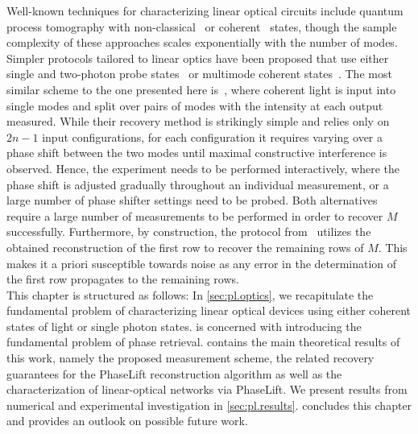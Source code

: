 Well-known techniques for characterizing linear optical circuits include quantum process tomography with non-classical~\cite{Brien_2004_Quantum} or coherent~\cite{Keshari_2011_Quantum} states, though the sample complexity of these approaches scales exponentially with the number of modes.
Simpler protocols tailored to linear optics have been proposed that use either single and two-photon probe states~\cite{Laing_2012_SuperStable,Dhand_2016_Accurate,Spagnolo_2017_Learning} or multimode coherent states~\cite{Keshari_2013_Direct,Tillmann_2016_On}.
The most similar scheme to the one presented here is~\cite{Keshari_2013_Direct}, where coherent light is input into single modes and split over pairs of modes with the intensity at each output measured.
While their recovery method is strikingly simple and relies only on $2n-1$ input configurations, for each configuration it requires varying over a phase shift between the two modes until maximal constructive interference is observed.
Hence, the experiment needs to be performed interactively, where the phase shift is adjusted gradually throughout an individual measurement, or a large number of phase shifter settings need to be probed.
Both alternatives require a large number of measurements to be performed in order to recover $M$ successfully.
Furthermore, by construction, the protocol from~\cite{Keshari_2013_Direct} utilizes the obtained reconstruction of the first row to recover the remaining rows of $M$.
This makes it a priori susceptible towards noise as any error in the determination of the first row propagates to the remaining rows.\\



This chapter is structured as follows:
In \cref{sec:pl.optics}, we recapitulate the fundamental problem of characterizing linear optical devices using either coherent states of light or single photon states.
 is concerned with introducing the fundamental problem of phase retrieval.
 contains the main theoretical results of this work, namely the proposed measurement scheme, the related recovery guarantees for the PhaseLift reconstruction algorithm as well as the characterization of linear-optical networks via PhaseLift.
We present results from numerical and experimental investigation in \cref{sec:pl.results}.
 concludes this chapter and provides an outlook on possible future work.


